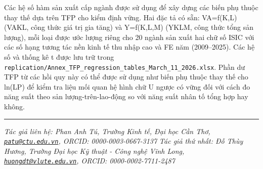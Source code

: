 \documentclass[12pt,a4paper]{article}
\begin{document}
Các hệ số hàm sản xuất cấp ngành được sử dụng để xây dựng các biến phụ
thuộc thay thế dựa trên TFP cho kiểm định vững. Hai đặc tả có sẵn:
VA=f(K,L) (VAKL, công thức giá trị gia tăng) và Y=f(K,L,M) (YKLM, công
thức tổng sản lượng), mỗi loại được ước lượng riêng cho 20 ngành sản
xuất hai chữ số ISIC với các số hạng tương tác nền kinh tế thu nhập cao
và FE năm (2009--2025). Các hệ số và thống kê t được lưu trữ trong
\texttt{replication/Annex\_TFP\_regression\_tables\_March\_11\_2026.xlsx}.
Phần dư TFP từ các hồi quy này có thể được sử dụng như biến phụ thuộc
thay thế cho ln(LP) để kiểm tra liệu mối quan hệ hình chữ U ngược có
vững đối với cách đo năng suất theo sản lượng-trên-lao-động so với năng
suất nhân tố tổng hợp hay không.

\begin{center}\rule{0.5\linewidth}{0.5pt}\end{center}

\emph{Tác giả liên hệ: Phan Anh Tú, Trường Kinh tế, Đại học Cần Thơ,
\href{mailto:patu@ctu.edu.vn}{\nolinkurl{patu@ctu.edu.vn}}, ORCID:
0000-0003-0667-3137} \emph{Tác giả thứ nhất: Đỗ Thùy Hương, Trường Đại
học Kỹ thuật - Công nghệ Vĩnh Long,
\href{mailto:huongdt@vlute.edu.vn}{\nolinkurl{huongdt@vlute.edu.vn}},
ORCID: 0000-0002-7711-2487}
\end{document}
